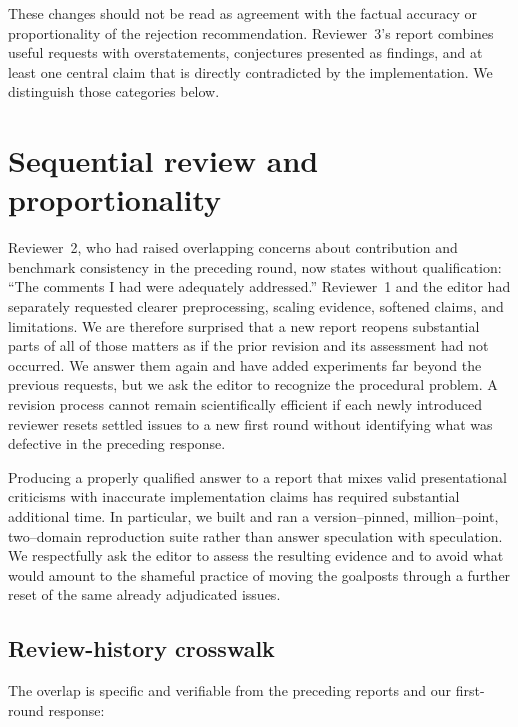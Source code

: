 \documentclass[11pt]{article}
\begin{document}
These changes should not be read as agreement with the factual accuracy or
proportionality of the rejection recommendation. Reviewer~3's report combines
useful requests with overstatements, conjectures presented as findings, and at
least one central claim that is directly contradicted by the implementation.
We distinguish those categories below.

\section*{Sequential review and proportionality}

Reviewer~2, who had raised overlapping concerns about contribution and
benchmark consistency in the preceding round, now states without
qualification: ``The comments I had were adequately addressed.'' Reviewer~1
and the editor had separately requested clearer preprocessing, scaling
evidence, softened claims, and limitations. We are therefore surprised that a
new report reopens substantial parts of all of those matters as if the prior
revision and its assessment had not occurred. We answer them again and have
added experiments far beyond the previous requests, but we ask the editor to
recognize the procedural problem. A revision process cannot remain
scientifically efficient if each newly introduced reviewer resets settled
issues to a new first round without identifying what was defective in the
preceding response.

Producing a properly qualified answer to a report that mixes valid
presentational criticisms with inaccurate implementation claims has required
substantial additional time. In particular, we built and ran a version--pinned,
million--point, two--domain reproduction suite rather than answer speculation
with speculation. We respectfully ask the editor to assess the resulting
evidence and to avoid what would amount to the shameful practice of moving the
goalposts through a further reset of the same already adjudicated issues.

\subsection*{Review-history crosswalk}

The overlap is specific and verifiable from the preceding reports and our
first-round response:
\end{document}

